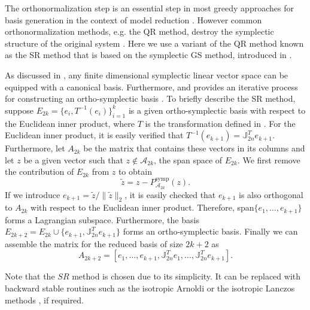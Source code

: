 The orthonormalization step is an essential step in most greedy approaches for basis generation in the context of model reduction \cite{hesthaven2015certified,quarteroni2015reduced}. However common orthonormalization methods, e.g. the QR method, destroy the symplectic structure of the original system \cite{bunse1986matrix}. Here we use a variant of the QR method known as the SR \cite{Salam2014} method that is based on the symplectic GS method, introduced in .

As discussed in , any finite dimensional symplectic linear vector space can be equipped with a canonical basis. Furthermore,  and  provides an iterative process for constructing an ortho-symplectic basis \cite{Salam2014}. To briefly describe the SR method, suppose $E_{2k}=\{ e_i, T^{-1}(e_i) \}_{i=1}^{k}$ is a given ortho-symplectic basis with respect to the Euclidean inner product, where $T$ is the transformation defined in . For the Euclidean inner product, it is easily verified that $T^{-1}(e_{k+1}) =  \mathbb J_{2n}^T e_{k+1}$. Furthermore, let $A_{2k}$ be the matrix that contains these vectors in its columns and let $z$ be a given vector such that $z\not \in \mathcal A_{2k}$, the span space of $E_{2k}$. We first remove the contribution of $E_{2k}$ from $z$ to obtain
\begin{equation} \label{p1.eq:SyMo:14.1}
	\tilde z = z - P_{\mathcal A_{2k}}^{\text{symp}}(z).
\end{equation}
If we introduce $e_{k+1} = \tilde z / \| \tilde z \|_2$, it is easily checked that $e_{k+1}$ is also orthogonal to $A_{2k}$ with respect to the Euclidean inner product. Therefore, span$\{e_1,\dots,e_{k+1}\}$ forms a Lagrangian subspace. Furthermore, the basis $E_{2k+2}= E_{2k} \cup \{ e_{k+1} , \mathbb J^T_{2n} e_{k+1} \}$ forms an ortho-symplectic basis. Finally we can assemble the matrix for the reduced basis of size $2k+2$ as
\begin{equation} \label{p1.eq:SyMo:14.2}
	A_{2k+2} = [e_1,\dots,e_{k+1},\mathbb J_{2n}^T e_1,\dots,\mathbb J_{2n}^T e_{k+1} ].
\end{equation}

Note that the $SR$ method is chosen due to its simplicity. It can be replaced with backward stable routines such as the isotropic Arnoldi or the isotropic Lanczos methods \cite{doi:10.1137/S1064827500366434}, if required.


